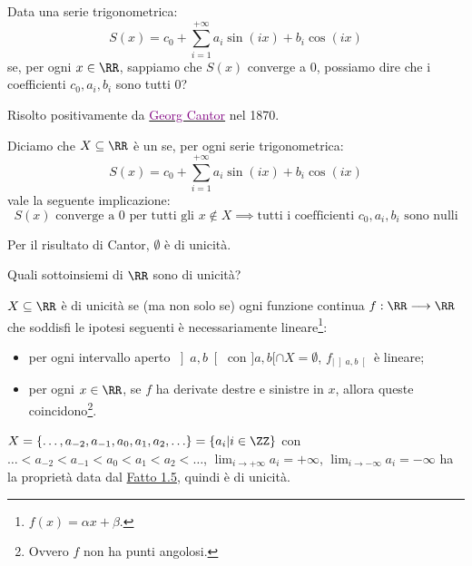 \documentclass[11pt]{scrartcl}
\begin{document}
\begin{problem}
Data una serie trigonometrica:
\[ S(x) = c_0 + \sum_{i=1}^{+\infty}a_i\sin{(ix)}+b_i\cos{(ix)}
	\]
se, per ogni $x \in \RR$, sappiamo che $S(x)$ converge a 0, possiamo dire che i coefficienti $c_0,a_i,b_i$ sono tutti 0?
\end{problem}

Risolto positivamente da \href{https://it.wikipedia.org/wiki/Georg_Cantor}{\textcolor{purple}{Georg Cantor}} nel 1870.

\begin{definition}
Diciamo che $X \subseteq \RR$ è un  se, per ogni serie trigonometrica:
\[ S(x) = c_0 + \sum_{i=1}^{+\infty}a_i\sin{(ix)}+b_i\cos{(ix)}
	\]
vale la seguente implicazione:
\[ \text{$S(x)$ converge a 0 per tutti gli $x\not\in X$} \implies \text{tutti i coefficienti $c_0,a_i,b_i$ sono nulli}
	\]
\end{definition}

\begin{example}
	Per il risultato di Cantor, $\emptyset$ è di unicità.
\end{example}

\begin{problem}
	Quali sottoinsiemi di $\RR$ sono di unicità?
\end{problem}

\begin{fact}
\label{unicità}
$X \subseteq \RR$ è di unicità se (ma non solo se) ogni funzione continua $f : \RR \longrightarrow \RR$ che soddisfi le ipotesi seguenti è necessariamente lineare\footnote{$f(x) = \alpha x + \beta$.}:
\begin{itemize}
	\item per ogni intervallo aperto $\left]a,b\right[$ con $]a,b[ \cap X = \emptyset$, $f_{|\left]a,b\right[}$ è lineare;
	\item per ogni $x \in \RR$, se $f$ ha derivate destre e sinistre in $x$, allora queste coincidono\footnote{Ovvero $f$ non ha punti angolosi.}.
\end{itemize}
\end{fact}

\begin{example}
	$X = \{\ldots,a_{-2},a_{-1},a_0,a_1,a_2,\ldots\} = \{a_i | i \in \ZZ\}$ con $\ldots < a_{-2} < a_{-1} < a_0 < a_1 < a_2 <\ldots$, $\displaystyle\lim_{i \to +\infty} a_i = +\infty$, $\displaystyle\lim_{i \to -\infty} a_i = -\infty$ ha la 
	proprietà data dal \hyperref[unicità]{Fatto 1.5}, quindi è di unicità.
\end{example}
\end{document}

